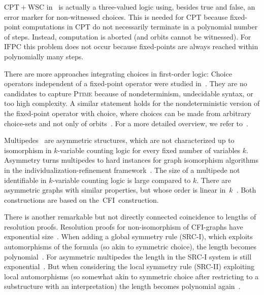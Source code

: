 \documentclass[]{lmcs}
\newcommand{\PTime}{\textsc{Ptime}}
\newcommand{\CPT}{\ensuremath{\mathrm{CPT}}}
\newcommand{\CPTWSC}{\ensuremath{\mathrm{CPT{+}WSC}}}
\newcommand{\IFPC}{\ensuremath{\mathrm{IFPC}}}
\begin{document}
\CPTWSC{} in~\cite{LichterSchweitzer24} is actually a three-valued logic
using, besides true and false, an error marker for non-witnessed choices.
This is needed for \CPT{} because fixed-point computations in \CPT{} do not necessarily terminate in a polynomial number of steps. Instead, computation is aborted
(and orbits cannot be witnessed).
For \IFPC{} this problem does not occur
because fixed-points are always reached within polynomially many steps.

There are more approaches integrating choices in first-order logic:
Choice operators independent of a fixed-point operator
were studied in~\cite{BlassGurevich2000, Otto2000}.
They are no candidates to capture \PTime{}
because of nondeterminism, undecidable syntax, or too high complexity.
A similar statement holds for the nondeterministic version of the fixed-point operator with choice, where choices can be made from arbitrary choice-sets and not only of orbits~\cite{DawarRicherby03Nondet}.
For a more detailed overview, we refer to~\cite{RicherbyThesis2004}.

Multipedes~\cite{GurevichShelah96} are asymmetric structures,
which are not characterized up to isomorphism in $k$-variable counting logic for every fixed number of variables $k$.
Asymmetry turns multipedes to hard instances for graph isomorphism algorithms
in the individualization-refinement framework~\cite{NeuenSchweitzer18, AndersSchweitzer21}.
The size of a multipede not identifiable in $k$-variable counting logic is large compared to $k$.
There are asymmetric graphs
with similar properties, but whose order is linear in~$k$~\cite{DawarKhan19}.
Both constructions are based on the~CFI~construction.

There is another remarkable but not directly connected coincidence to
lengths of resolution proofs.
Resolution proofs for non-isomorphism of CFI-graphs
have exponential size~\cite{Toran13}.
When adding a global symmetry rule (SRC-I),
which exploits automorphisms of the formula
(so akin to symmetric choice),
the length becomes polynomial~\cite{SchweitzerSeebach21}.
For asymmetric multipedes  the length in the SRC-I system
is still exponential~\cite{ToranWoerz23}.
But when considering the local symmetry rule (SRC-II)
exploiting local automorphisms
(so somewhat akin to symmetric choice after restricting to a substructure with an interpretation)
the length becomes polynomial again~\cite{SchweitzerSeebach21}.
\end{document}
